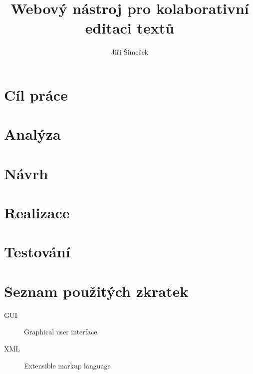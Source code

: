 \documentclass[thesis=B,czech]{./template/FITthesis}[2012/06/26]
\title{Webový nástroj pro kolaborativní editaci textů}
\author{Jiří Šimeček} %
\begin{document}

    \begin{introduction}
        
    \end{introduction}

    \chapter{Cíl práce}
    

    \chapter{Analýza}
    

    \chapter{Návrh}
    

    \chapter{Realizace}
    

    \chapter{Testování}
    

    \begin{conclusion}
        
    \end{conclusion}

    \printbibliography

    \appendix

    \chapter{Seznam použitých zkratek}
    \begin{description}
        \item[GUI] Graphical user interface
        \item[XML] Extensible markup language
    \end{description}
\end{document}
